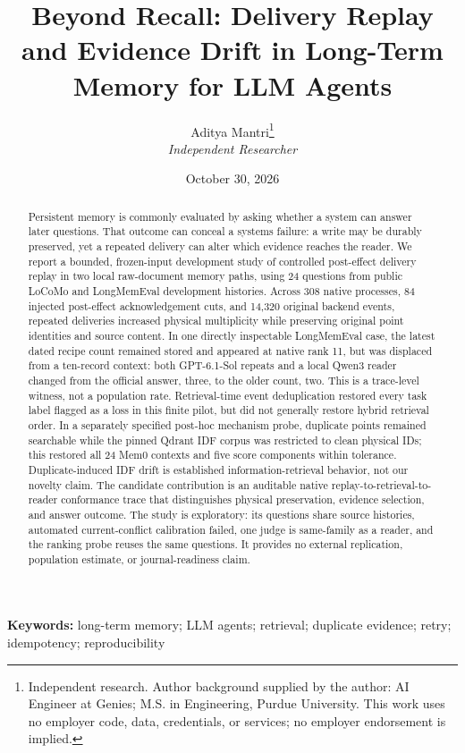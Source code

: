 \documentclass[10pt,letterpaper]{article}
\title{Beyond Recall: Delivery Replay and Evidence Drift in Long-Term Memory for LLM Agents}
\author{Aditya Mantri\thanks{Independent research. Author background supplied by the author: AI Engineer at Genies; M.S. in Engineering, Purdue University. This work uses no employer code, data, credentials, or services; no employer endorsement is implied.}\\\textit{Independent Researcher}}
\date{October 30, 2026}
\begin{document}
\maketitle

\begin{abstract}
Persistent memory is commonly evaluated by asking whether a system can answer later questions. That outcome can conceal a systems failure: a write may be durably preserved, yet a repeated delivery can alter which evidence reaches the reader. We report a bounded, frozen-input development study of controlled post-effect delivery replay in two local raw-document memory paths, using 24 questions from public LoCoMo and LongMemEval development histories. Across 308 native processes, 84 injected post-effect acknowledgement cuts, and 14,320 original backend events, repeated deliveries increased physical multiplicity while preserving original point identities and source content. In one directly inspectable LongMemEval case, the latest dated recipe count remained stored and appeared at native rank 11, but was displaced from a ten-record context: both GPT-6.1-Sol repeats and a local Qwen3 reader changed from the official answer, three, to the older count, two. This is a trace-level witness, not a population rate. Retrieval-time event deduplication restored every task label flagged as a loss in this finite pilot, but did not generally restore hybrid retrieval order. In a separately specified post-hoc mechanism probe, duplicate points remained searchable while the pinned Qdrant IDF corpus was restricted to clean physical IDs; this restored all 24 Mem0 contexts and five score components within tolerance. Duplicate-induced IDF drift is established information-retrieval behavior, not our novelty claim. The candidate contribution is an auditable native replay-to-retrieval-to-reader conformance trace that distinguishes physical preservation, evidence selection, and answer outcome. The study is exploratory: its questions share source histories, automated current-conflict calibration failed, one judge is same-family as a reader, and the ranking probe reuses the same questions. It provides no external replication, population estimate, or journal-readiness claim.
\end{abstract}

\noindent\textbf{Keywords:} long-term memory; LLM agents; retrieval; duplicate evidence; retry; idempotency; reproducibility
\end{document}
